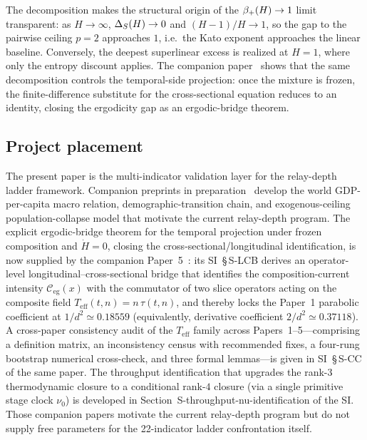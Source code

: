 The decomposition makes the structural origin of the $\beta_+\!\left(H\right)\to 1$ limit
transparent: as $H\to\infty$, $\Delta_{S}(H)\to 0$ and $(H-1)/H\to 1$, so the gap
to the pairwise ceiling $p=2$ approaches $1$, i.e.\ the Kato exponent
approaches the linear baseline.  Conversely, the deepest superlinear excess
is realized at $H=1$, where only the entropy discount applies.  The companion
paper~\cite{Kato2026c} shows that the same decomposition controls the
temporal-side projection: once the mixture is frozen, the finite-difference
substitute for the cross-sectional equation reduces to an identity, closing
the ergodicity gap as an ergodic-bridge theorem.

\subsection{Project placement}

The present paper is the multi-indicator validation layer for the
relay-depth ladder framework. Companion preprints in preparation~\cite{Kato2026a,Kato2026b,Kato2026c}
develop the world GDP-per-capita macro relation, demographic-transition
chain, and exogenous-ceiling population-collapse model that motivate the
current relay-depth program.
The explicit ergodic-bridge theorem for the temporal projection under frozen
composition and $\dot H = 0$, closing the cross-sectional/longitudinal
identification, is now supplied by the companion Paper~5~\cite{Kato2026e}:
its SI~\S\,S-LCB derives an operator-level longitudinal--cross-sectional
bridge that identifies the composition-current intensity
$\mathcal{C}_{\mathrm{eg}}(x)$ with the commutator of two slice operators
acting on the composite field $T_{\mathrm{eff}}(t,n)=n\,\tau(t,n)$, and
thereby locks the Paper~1 parabolic coefficient at $1/d^{2}\simeq 0.18559$ (equivalently, derivative coefficient $2/d^{2}\simeq 0.37118$). A
cross-paper consistency audit of the $T_{\mathrm{eff}}$ family across
Papers~1--5---comprising a definition matrix, an inconsistency census with
recommended fixes, a four-rung bootstrap numerical cross-check, and three
formal lemmas---is given in SI~\S\,S-CC of the same paper.
The throughput identification that upgrades the rank-$3$ thermodynamic closure
to a conditional rank-$4$ closure (via a single primitive stage clock
$\nu_0$) is developed in Section~\textsf{S-throughput-nu-identification} of the
SI.
Those companion papers motivate the current relay-depth program but do not
supply free parameters for the 22-indicator ladder confrontation itself.

